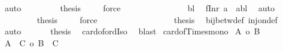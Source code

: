 \begin{isabellebody}
\ auto\isanewline
\ \ \ \ \ \ \ \isamarkupfalse%
\ {\isacharquery}{\kern0pt}thesis\ \isamarkupfalse%
\ {\isacharasterisk}{\kern0pt}\ \isamarkupfalse%
\ force\isanewline
\ \ \ \ \ \isamarkupfalse%
\isanewline
\ \ \ \ \ \ \ \isamarkupfalse%
\ {\isachardoublequoteopen}{\isasymnot}\ bl{\isachardoublequoteclose}\ \isamarkupfalse%
\ {\isachardoublequoteopen}{\isacharquery}{\kern0pt}f{\isacharparenleft}{\kern0pt}Inr\ a{\isacharparenright}{\kern0pt}\ {\isacharequal}{\kern0pt}\ {\isacharparenleft}{\kern0pt}a{\isacharcomma}{\kern0pt}bl{\isacharparenright}{\kern0pt}{\isachardoublequoteclose}\ \isamarkupfalse%
\ auto\isanewline
\ \ \ \ \ \ \ \isamarkupfalse%
\ {\isacharquery}{\kern0pt}thesis\ \isamarkupfalse%
\ {\isacharasterisk}{\kern0pt}\ \isamarkupfalse%
\ force\isanewline
\ \ \ \ \ \isamarkupfalse%
\isanewline
\ \ \ \ \isacommand{{\isacharbraceright}{\kern0pt}}\isamarkupfalse%
\isanewline
\ \ \ \ \isamarkupfalse%
\ \isamarkupfalse%
\ {\isacharquery}{\kern0pt}thesis\ \isamarkupfalse%
\ bij{\isacharunderscore}{\kern0pt}betw{\isacharunderscore}{\kern0pt}def\ inj{\isacharunderscore}{\kern0pt}on{\isacharunderscore}{\kern0pt}def\ \isamarkupfalse%
\ auto\isanewline
\ \ \isamarkupfalse%
\isanewline
\ \ \isamarkupfalse%
\ {\isacharquery}{\kern0pt}thesis\ \isamarkupfalse%
\ card{\isacharunderscore}{\kern0pt}of{\isacharunderscore}{\kern0pt}ordIso\ \isamarkupfalse%
\ blast\isanewline
{}\isamarkupfalse%
%
\endisatagproof
{\isafoldproof}%
%
\isadelimproof
\isanewline
%
\endisadelimproof
\isanewline
{}\isamarkupfalse%
\ card{\isacharunderscore}{\kern0pt}of{\isacharunderscore}{\kern0pt}Times{\isacharunderscore}{\kern0pt}mono{}{\isacharcolon}{\kern0pt}\isanewline
{}\ {\isachardoublequoteopen}{\isacharbar}{\kern0pt}A{\isacharbar}{\kern0pt}\ {\isasymle}o\ {\isacharbar}{\kern0pt}B{\isacharbar}{\kern0pt}{\isachardoublequoteclose}\isanewline
{}\ {\isachardoublequoteopen}{\isacharbar}{\kern0pt}A\ {\isasymtimes}\ C{\isacharbar}{\kern0pt}\ {\isasymle}o\ {\isacharbar}{\kern0pt}B\ {\isasymtimes}\ C{\isacharbar}{\kern0pt}{\isachardoublequoteclose}\isanewline
%
\isadelimproof
%
\endisadelimproof
%
\isatagproof
{}\isamarkupfalse%
{\isacharminus}{\kern0pt}\isanewline
\ \ \isamarkupfalse%

\end{isabellebody}
